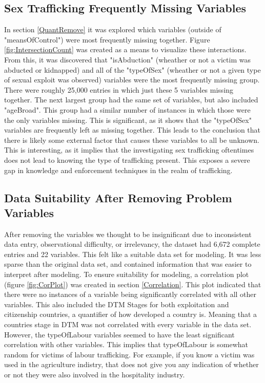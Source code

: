 \documentclass{article} %
\begin{document}
	\subsection{Sex Trafficking Frequently Missing Variables}
	
	In section \ref{QuantRemove} it was explored which variables (outside of "meansOfControl") were most frequently missing together. Figure \ref{fig:IntersectionCount} was created as a means to visualize these interactions. From this, it was discovered that "isAbduction" (wheather or not a victim was abducted or kidnapped) and all of the "typeOfSex" (wheather or not a given type of sexual exploit was observed) variables were the most frequently missing group. There were roughly 25,000 entries in which just these 5 variables missing together. The next largest group had the same set of variables, but also included "ageBroad". This group had a similar number of instances in which those were the only variables missing. This is significant, as it shows that the "typeOfSex" variables are frequently left as missing together. This leads to the conclusion that there is likely some external factor that causes these variables to all be unknown. This is interesting, as it implies that the investigating sex trafficking oftentimes does not lead to knowing the type of trafficking present. This exposes a severe gap in knowledge and enforcement techniques in the realm of trafficking.
	
	\subsection{Data Suitability After Removing Problem Variables}
	
	After removing the variables we thought to be insignificant due to inconsistent data entry, observational difficulty, or irrelevancy, the dataset had 6,672 complete entries and 22 variables. This felt like a suitable data set for modeling. It was less sparse than the original data set, and contained information that was easier to interpret after modeling. To ensure suitability for modeling, a correlation plot (figure \ref{fig:CorPlot}) was created in section \ref{Correlation}. This plot indicated that there were no instances of a variable being significantly correlated with all other variables. This also included the DTM Stages for both exploitation and citizenship countries, a quantifier of how developed a country is. Meaning that a countries stage in DTM was not correlated with every variable in the data set. However, the typeOfLabour variables seemed to have the least significant correlation with other variables. This implies that typeOfLabour is somewhat random for victims of labour trafficking. For example, if you know a victim was used in the agriculture indistry, that does not give you any indication of whether or not they were also involved in the hospitality industry.
	
\end{document}
